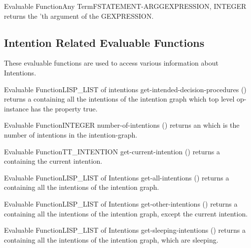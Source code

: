 \begin{typeefa}{Evaluable Function}{Any Term}{FSTATEMENT-ARG}{GEXPRESSION, INTEGER
}
returns the 'th argument of the GEXPRESSION.
\end{typeefa}

\subsection{Intention Related Evaluable Functions}

These evaluable functions are used to access various information about Intentions.

\begin{typeefa}{Evaluable Function}{LISP\_LIST of intentions}
{get-intended-decision-procedures} {()} 
returns a  containing all the intentions of the intention graph
which top level op-instance has the property  true.
\end{typeefa}

\begin{typeefa}{Evaluable Function}{INTEGER} {number-of-intentions} {()}
returns an  which is the number of intentions in the
intention-graph.
\end{typeefa}

\begin{typeefa}{Evaluable Function}{TT\_INTENTION} {get-current-intention} {()}
returns a  containing the current intention.
\end{typeefa}

\begin{typeefa}{Evaluable Function}{LISP\_LIST of Intentions} {get-all-intentions} {()}
returns a  containing all the intentions of the intention graph.
\end{typeefa}

\begin{typeefa}{Evaluable Function}{LISP\_LIST of Intentions} {get-other-intentions} {()}
returns a  containing all the intentions of the intention graph,
except the current intention.
\end{typeefa}

\begin{typeefa}{Evaluable Function}{LISP\_LIST of Intentions} {get-sleeping-intentions} {()}
returns a  containing all the intentions of the intention graph,
which are sleeping.
\end{typeefa}

